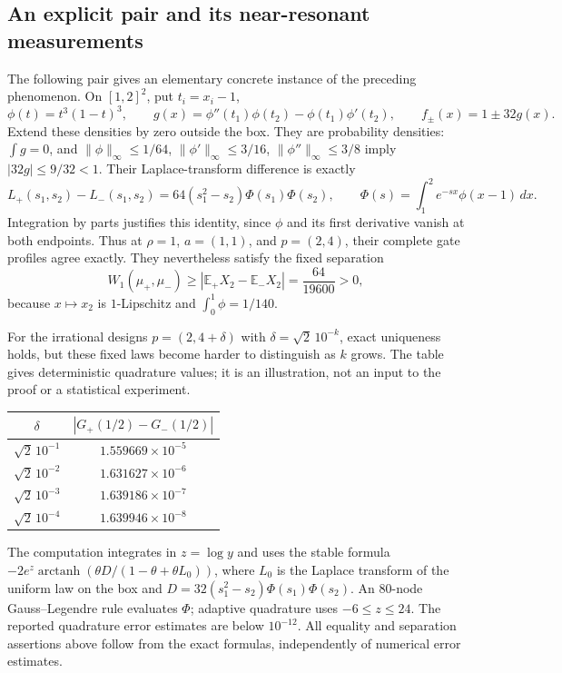 \documentclass[11pt,letterpaper]{article}
\theoremstyle{definition}
\theoremstyle{remark}
\newcommand{\1}{\mathbf 1}
\begin{document}
\subsection{An explicit pair and its near-resonant measurements}
\label{p07:sec:explicit-collision}
The following pair gives an elementary concrete instance of the preceding
phenomenon. On $[1,2]^2$, put $t_i=x_i-1$,
\[
 \phi(t)=t^3(1-t)^3,\qquad
 g(x)=\phi''(t_1)\phi(t_2)-\phi(t_1)\phi'(t_2),
 \qquad f_\pm(x)=1\pm32g(x).
\]
Extend these densities by zero outside the box. They are probability
densities: $\int g=0$, and
$\|\phi\|_\infty\le1/64$,
$\|\phi'\|_\infty\le3/16$,
$\|\phi''\|_\infty\le3/8$ imply $|32g|\le9/32<1$.
Their Laplace-transform difference is exactly
\[
 L_+(s_1,s_2)-L_-(s_1,s_2)
 =64(s_1^2-s_2)\Phi(s_1)\Phi(s_2),\qquad
 \Phi(s)=\int_1^2 e^{-sx}\phi(x-1)\,dx.
\]
Integration by parts justifies this identity, since $\phi$ and its
first derivative vanish at both endpoints. Thus at $\rho=1$, $a=(1,1)$,
and $p=(2,4)$, their complete gate profiles agree exactly.
They nevertheless satisfy the fixed separation
\[
 W_1(\mu_+,\mu_-)\ge
 |\mathbb E_+X_2-\mathbb E_-X_2|
 =\frac{64}{19600}>0,
\]
because $x\mapsto x_2$ is $1$-Lipschitz and $\int_0^1\phi=1/140$.

For the irrational designs $p=(2,4+\delta)$ with
$\delta=\sqrt2\,10^{-k}$, exact uniqueness holds, but these fixed
laws become harder to distinguish as $k$ grows. The table gives
deterministic quadrature values; it is an illustration, not an input to
the proof or a statistical experiment.
\begin{center}
\begin{tabular}{cc}
\toprule
$\delta$ & $|G_+(1/2)-G_-(1/2)|$\\
\midrule
$\sqrt{2}\,10^{-1}$ & $1.559669\times10^{-5}$ \\
$\sqrt{2}\,10^{-2}$ & $1.631627\times10^{-6}$ \\
$\sqrt{2}\,10^{-3}$ & $1.639186\times10^{-7}$ \\
$\sqrt{2}\,10^{-4}$ & $1.639946\times10^{-8}$ \\
\bottomrule
\end{tabular}
\end{center}
The computation integrates in $z=\log y$ and uses the stable formula
$-2e^z\operatorname{arctanh}(\theta D/(1-\theta+\theta L_0))$,
where $L_0$ is the Laplace transform of the uniform law on the box
and $D=32(s_1^2-s_2)\Phi(s_1)\Phi(s_2)$.
An 80-node Gauss--Legendre rule evaluates $\Phi$;
adaptive quadrature uses $-6\le z\le24$.
The reported quadrature error estimates are below $10^{-12}$.
All equality and separation assertions above follow from the exact
formulas, independently of numerical error estimates.
\end{document}
